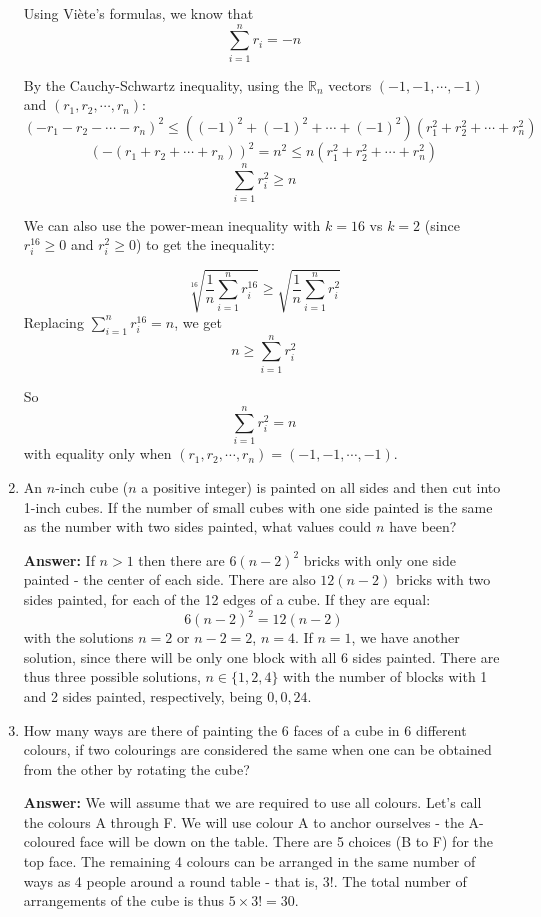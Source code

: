 \documentclass{article}
\begin{document}
\begin{enumerate}
    Using Viète's formulas, we know that
    \[  \sum_{i=1}^n r_i  = -n \]

    By the Cauchy-Schwartz inequality, using the $\mathbb{R}_n$ vectors $(-1, -1, \cdots, -1)$ and $(r_1, r_2, \cdots, r_n)$:
    \[ (-r_1 -r_2 -\cdots -r_n)^2 \leq ((-1)^2 + (-1)^2 + \cdots + (-1)^2)(r_1^2 + r_2^2 + \cdots + r_n^2)\]
    \[ (-(r_1 +r_2 +\cdots +r_n))^2 = n^2 \leq n(r_1^2 + r_2^2 + \cdots + r_n^2)\]
    \[ \sum_{i=1}^n r_i^{2} \geq n \]

    We can also use the power-mean inequality with $k=16$ vs $k=2$ (since $r_i^{16} \geq 0$ and $r_i^{2} \geq 0$) to get the inequality:
    
    \[\sqrt[16]{\frac{1}{n}\sum_{i=1}^n r_i^{16}} \geq \sqrt{\frac{1}{n}\sum_{i=1}^n r_i^{2}} \]
    Replacing $\sum_{i=1}^n r_i^{16} = n$, we get 
    \[n \geq \sum_{i=1}^n r_i^{2} \]
    
    So
    \[ \sum_{i=1}^n r_i^2 = n \]
    with equality only when $(r_1, r_2, \cdots, r_n) = (-1, -1, \cdots, -1)$.
    
    \item An $n$-inch cube ($n$ a positive integer) is painted on all sides and then cut into 1-inch cubes. If the number of small cubes with one side painted is the same as the number with two sides painted, what values could $n$ have been?
    
    \textbf{Answer:} If $n>1$ then there are $6(n-2)^2$ bricks with only one side painted - the center of each side. There are also $12(n-2)$ bricks with two sides painted, for each of the 12 edges of a cube. If they are equal:
    \[6(n-2)^2 = 12(n-2) \]
    with the solutions $n=2$ or $n-2 = 2$, $n=4$. If $n=1$, we have another solution, since there will be only one block with all 6 sides painted. There are thus three possible solutions, $n\in\{1, 2, 4\}$ with the number of blocks with 1 and 2 sides painted, respectively, being $0, 0, 24$.
    
    \item How many ways are there of painting the 6 faces of a cube in 6 different colours, if two colourings are considered the same when one can be obtained from the other by rotating the cube?
    
    \textbf{Answer:} We will assume that we are required to use all colours. Let's call the colours A through F. We will use colour A to anchor ourselves - the A-coloured face will be down on the table. There are 5 choices (B to F) for the top face. The remaining 4 colours can be arranged in the same number of ways as 4 people around a round table - that is, 3!. The total number of arrangements of the cube is thus $5\times 3! = 30$.
    

\end{enumerate}
\end{document}

